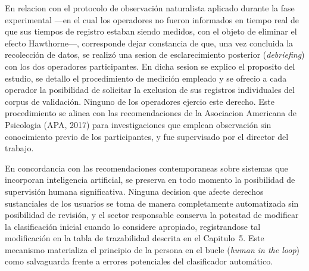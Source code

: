 En relacion con el protocolo de observación naturalista aplicado durante la fase experimental ---en el cual los operadores no fueron informados en tiempo real de que sus tiempos de registro estaban siendo medidos, con el objeto de eliminar el efecto Hawthorne---, corresponde dejar constancia de que, una vez concluida la recolección de datos, se realizó una sesion de esclarecimiento posterior (\textit{debriefing}) con los dos operadores participantes. En dicha sesion se explico el proposito del estudio, se detallo el procedimiento de medición empleado y se ofrecio a cada operador la posibilidad de solicitar la exclusion de sus registros individuales del corpus de validación. Ninguno de los operadores ejercio este derecho. Este procedimiento se alinea con las recomendaciones de la Asociacion Americana de Psicologia (APA, 2017) para investigaciones que emplean observación sin conocimiento previo de los participantes, y fue supervisado por el director del trabajo.

En concordancia con las recomendaciones contemporaneas sobre sistemas que incorporan inteligencia artificial, se preserva en todo momento la posibilidad de supervisión humana significativa. Ninguna decision que afecte derechos sustanciales de los usuarios se toma de manera completamente automatizada sin posibilidad de revisión, y el sector responsable conserva la potestad de modificar la clasificación inicial cuando lo considere apropiado, registrandose tal modificación en la tabla de trazabilidad descrita en el Capitulo~5. Este mecanismo materializa el principio de la persona en el bucle (\emph{human in the loop}) como salvaguarda frente a errores potenciales del clasificador automático.

\newpage
